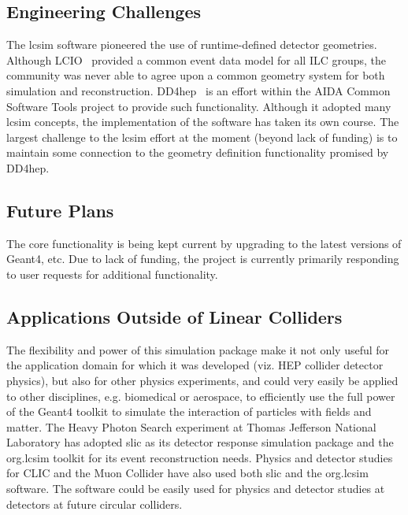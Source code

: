 \subsection{Engineering Challenges}

The lcsim software pioneered the use of runtime-defined detector geometries.
Although LCIO~\cite{lcioWebsite} provided a common event data model for all ILC groups, the
community was never able to agree upon a common geometry system for both
simulation and reconstruction. DD4hep~\cite{dd4hepWebsite} is an effort within the AIDA Common
Software Tools project to provide such functionality. Although it adopted many
lcsim concepts, the implementation of the software has taken its own course. The
largest challenge to the lcsim effort at the moment (beyond lack of funding) is
to maintain some connection to the geometry definition functionality promised by
DD4hep.

\subsection{Future Plans}

The core functionality is being kept current by upgrading to the latest versions
of Geant4, etc. Due to lack of funding, the project is currently primarily
responding to user requests for additional functionality.

\subsection{Applications Outside of Linear Colliders}

The flexibility and power of this simulation package make it not only useful for
the application domain for which it was developed (viz. HEP collider detector
physics), but also for other physics experiments, and could very easily be
applied to other disciplines, e.g. biomedical or aerospace, to efficiently use
the full power of the Geant4 toolkit to simulate the interaction of particles
with fields and matter. The Heavy Photon Search experiment at Thomas
Jefferson National Laboratory has adopted slic as its detector response
simulation package and the org.lcsim toolkit for its event reconstruction needs.
Physics and detector studies for CLIC and the Muon Collider have also
used both slic and the org.lcsim software. The software could be easily used for
physics and detector studies at detectors at future circular colliders.
